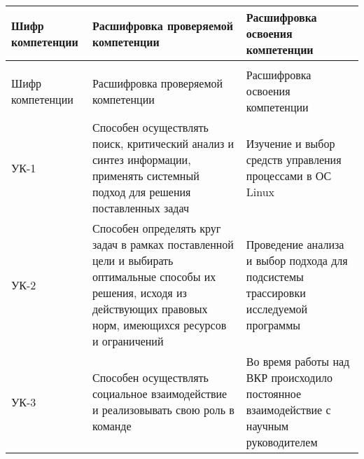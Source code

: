 {
\fontsize{12}{9}\selectfont
\vspace*{-12pt}
\noindent \begin{longtable}[c]{|p{2.2cm}|p{6.5cm}|p{6.5cm}|}
\hline
Шифр компетенции & Расшифровка проверяемой компетенции & Расшифровка освоения компетенции\\
\hline
\endfirsthead
\caption*{\raggedright\hspace{-10pt} Продолжение таблицы 1\vspace*{-35pt}}\\
\hline
Шифр компетенции & Расшифровка проверяемой компетенции & Расшифровка освоения компетенции\\
\hline
\endhead
УК-1 &
Способен осуществлять поиск, критический анализ и синтез информации, применять системный подход для решения поставленных задач &
Изучение и выбор средств управления процессами в ОС Linux
\\ \hline

УК-2 &
Способен определять круг задач в рамках поставленной цели и выбирать оптимальные способы их решения, исходя из действующих правовых норм, имеющихся ресурсов и ограничений &
Проведение анализа и выбор подхода для подсистемы трассировки исследуемой программы
\\ \hline

УК-3 &
Способен осуществлять социальное взаимодействие и реализовывать свою роль в команде &
Во время работы над ВКР происходило постоянное взаимодействие с научным руководителем
\\ \hline


\end{longtable}}
